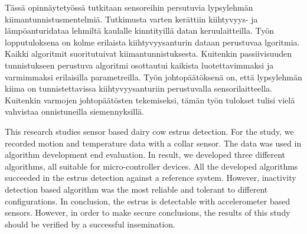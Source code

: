 
\begin{abstractpage}[finnish]
  Tässä opinnäytetyössä tutkitaan sensoreihin persutuvia lypsylehmän kiimantunnistusmentelmiä. Tutkimusta varten kerättiin kiihtyvyys- ja lämpöanturidataa lehmiltä kaulalle kinntityillä datan keruulaitteilla. Työn lopputuloksena on kolme erilaista kiihtyvyysanturin dataan perustuvaa lgoritmia. Kaikki algoritmit suoritutuivat kiimantunnistuksesta. Kuitenkin passiivisuuden tunnistukseen perustuva algoritmi osottautui kaikista luotettavimmaksi ja varmimmaksi erilaisilla parametreilla. Työn johtopäätöksenä on, että lypsylehmän kiima on tunnistettavissa kiihtyvyysanturiin perustuvalla sensorilaitteella. Kuitenkin varmojen johtopäätösten tekemiseksi, tämän työn tulokset tulisi vielä vahvistaa onnistuneilla siemennyksillä.
\end{abstractpage}

\newpage
%
\begin{abstractpage}[english]
This research studies sensor based dairy cow estrus detection. For the study, we recorded motion and temperature data with a collar sensor. The data was used in algorithm development end evaluation. In result, we developed three different algorithms, all suitable for micro-controller devices. All the developed algorithms succeeded in the estrus detection against a reference system. However, inactivity detection based algorithm was the most reliable and tolerant to different configurations. In conclusion, the estrus is detectable with accelerometer based sensors. However, in order to make secure conclusions, the results of this study should be verified by a successful insemination. 
\end{abstractpage}

